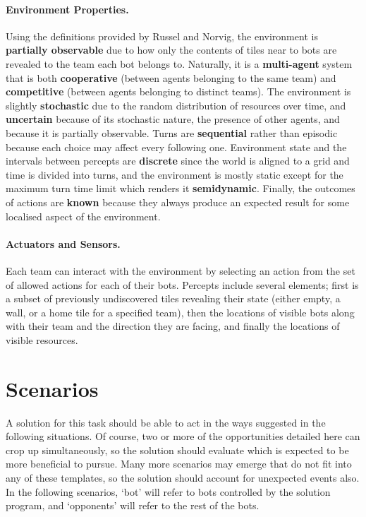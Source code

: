 \documentclass[a4paper,10pt]{article}
\begin{document}
\paragraph{Environment Properties.}
Using the definitions provided by Russel and Norvig\cite{norvig10}, the environment is \textbf{partially observable} due to how only the contents of tiles near to bots are revealed to the team each bot belongs to. Naturally, it is a \textbf{multi-agent} system that is both \textbf{cooperative} (between agents belonging to the same team) and \textbf{competitive} (between agents belonging to distinct teams). The environment is slightly \textbf{stochastic} due to the random distribution of resources over time, and \textbf{uncertain} because of its stochastic nature, the presence of other agents, and because it is partially observable. Turns are \textbf{sequential} rather than episodic because each choice may affect every following one. Environment state and the intervals between percepts are \textbf{discrete} since the world is aligned to a grid and time is divided into turns, and the environment is mostly static except for the maximum turn time limit which renders it \textbf{semidynamic}. Finally, the outcomes of actions are \textbf{known} because they always produce an expected result for some localised aspect of the environment.

\paragraph{Actuators and Sensors.}
Each team can interact with the environment by selecting an action from the set of allowed actions for each of their bots. Percepts include several elements; first is a subset of previously undiscovered tiles revealing their state (either empty, a wall, or a home tile for a specified team), then the locations of visible bots along with their team and the direction they are facing, and finally the locations of visible resources.

\section{Scenarios}
A solution for this task should be able to act in the ways suggested in the following situations. Of course, two or more of the opportunities detailed here can crop up simultaneously, so the solution should evaluate which is expected to be more beneficial to pursue. Many more scenarios may emerge that do not fit into any of these templates, so the solution should account for unexpected events also. In the following scenarios, `bot' will refer to bots controlled by the solution program, and `opponents' will refer to the rest of the bots.
\end{document}
